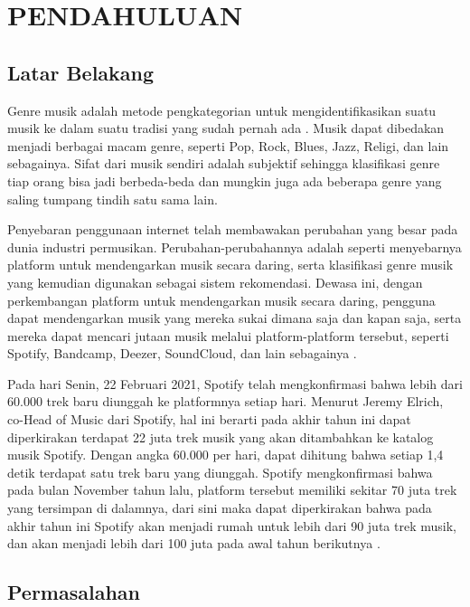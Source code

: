 \chapter{PENDAHULUAN}
\label{chap:pendahuluan}


\section{Latar Belakang}
\label{sec:latarbelakang}

Genre musik adalah metode pengkategorian untuk mengidentifikasikan suatu musik ke dalam suatu tradisi yang sudah pernah ada \citep{Genre}. Musik dapat dibedakan menjadi berbagai macam genre, seperti Pop, Rock, Blues, Jazz, Religi, dan lain sebagainya. Sifat dari musik sendiri adalah subjektif sehingga klasifikasi genre tiap orang bisa jadi berbeda-beda dan mungkin juga ada beberapa genre yang saling tumpang tindih satu sama lain.

Penyebaran penggunaan internet telah membawakan perubahan yang besar pada dunia industri permusikan. Perubahan-perubahannya adalah seperti menyebarnya platform untuk mendengarkan musik secara daring, serta klasifikasi genre musik yang kemudian digunakan sebagai sistem rekomendasi. Dewasa ini, dengan perkembangan platform untuk mendengarkan musik secara daring, pengguna dapat mendengarkan musik yang mereka sukai dimana saja dan kapan saja, serta mereka dapat mencari jutaan musik melalui platform-platform tersebut, seperti Spotify, Bandcamp, Deezer, SoundCloud, dan lain sebagainya \citep{Elbir2018MusicGC}.

Pada hari Senin, 22 Februari 2021, Spotify telah mengkonfirmasi bahwa lebih dari 60.000 trek baru diunggah ke platformnya setiap hari. Menurut Jeremy Elrich, co-Head of Music dari Spotify, hal ini berarti pada akhir tahun ini dapat diperkirakan terdapat 22 juta trek musik yang akan ditambahkan ke katalog musik Spotify. Dengan angka 60.000 per hari, dapat dihitung bahwa setiap 1,4 detik terdapat satu trek baru yang diunggah. Spotify mengkonfirmasi bahwa pada bulan November tahun lalu, platform tersebut memiliki sekitar 70 juta trek yang tersimpan di dalamnya, dari sini maka dapat diperkirakan bahwa pada akhir tahun ini Spotify akan menjadi rumah untuk lebih dari 90 juta trek musik, dan akan menjadi lebih dari 100 juta pada awal tahun berikutnya \citep{musicb}.

\section{Permasalahan}
\label{sec:permasalahan}


